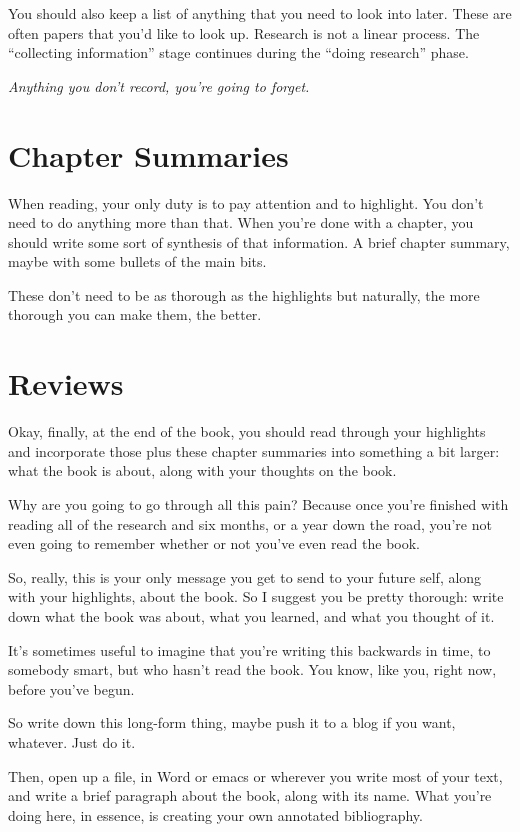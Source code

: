 You should also keep a list of anything that you need to look into later. These are
often papers that you'd like to look up. Research is not a linear process. The
``collecting information'' stage continues during the ``doing research'' phase.

\textit{Anything you don't record, you're going to forget.}

\section{Chapter Summaries}

When reading, your only duty is to pay attention and to highlight. You don't
need to do anything more than that. When you're done with a chapter, you should
write some sort of synthesis of that information. A brief chapter summary, maybe
with some bullets of the main bits.

These don't need to be as thorough as the highlights but naturally, the more
thorough you can make them, the better.

\section{Reviews}

Okay, finally, at the end of the book, you should read through your highlights
and incorporate those plus these chapter
summaries into something a bit larger: what the book is about, along with your
thoughts on the book.

Why are you going to go through all this pain? Because once you're finished
with reading all of the research and six months, or a year down the road,
you're not even going to remember whether or not you've even read the book.

So, really, this is your only message you get to send to your future self, along
with your highlights, about the book. So I suggest you be pretty
thorough: write down what the book was about, what you learned, and what you
thought of it.

It's sometimes useful to imagine that you're writing this backwards in time, to
somebody smart, but who hasn't read the book. You know, like you, right now,
before you've begun.

So write down this long-form thing, maybe push it to a blog if you want,
whatever. Just do it.

Then, open up a file, in Word or emacs or wherever you write most of your text,
and write a brief paragraph about the book, along with its name. What you're
doing here, in essence, is creating your own annotated bibliography.

